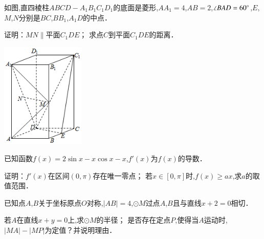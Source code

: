 \documentclass[a4paper]{BHCexam}
\begin{document}
\begin{groups}
\begin{questions}[t]
\begin{minipage}{\textwidth}
\begin{solution}{8cm}
\end{solution}
\end{minipage}
\begin{minipage}{\textwidth}
\question[12] 如图,直四棱柱$ABCD-A _{1} B _{1} C _{1} D _{1}$的底面是菱形,$AA _{1} =4$,$AB=2$,$ \angle BAD=60^{\small \circ}$,$E$,$M$,$N$分别是$BC$,$BB _{1}$,$A _{1} D$的中点．
\begin{subquestions}
    \subquestion 证明：$MN \parallel$平面$C _{1} DE$；
    \subquestion 求点$C$到平面$C _{1} DE$的距离．
\end{subquestions}
\begin{center}
\includegraphics[width=4cm]{./rOqrX8AOkhQtAGTSvgdyU0mzeH3pIfTp.png}
\vspace{0.5cm}
\end{center}
\begin{solution}{4cm}

\end{solution}
\end{minipage}
\begin{minipage}{\textwidth}
\question[12] 已知函数$f(x)=2\sin x-x\cos x-x$,$f ' (x)$为$f(x)$的导数．
\begin{subquestions}
	\subquestion 证明：$f ' (x)$在区间$(0 ,  \pi )$存在唯一零点； 
	\subquestion 若$x \in [0 ,  \pi ]$时,$f(x)\geqslant ax$,求$a$的取值范围．
\end{subquestions}
\begin{solution}{8cm}

\end{solution}
\end{minipage}
\begin{minipage}{\textwidth}
\question[12] 已知点$A$,$B$关于坐标原点$O$对称,$|AB|=4$,$ \odot M$过点$A$,$B$且与直线$x+2=0$相切．
\begin{subquestions}
    \subquestion 若$A$在直线$x+y=0$上,求$ \odot M$的半径； 
    \subquestion 是否存在定点$P$,使得当$A$运动时,$|MA|-|MP|$为定值？并说明理由．
\end{subquestions}
\begin{solution}{8cm}


\end{solution}
\end{minipage}
\end{questions}
\end{groups}
\end{document}
